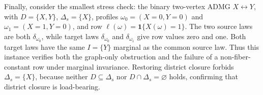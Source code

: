 Finally, consider the smallest stress check: the binary two-vertex ADMG \(X\leftrightarrow Y\), with \(D=\{X,Y\}\), \(\Delta_s=\{X\}\), profiles \(\omega_0=(X=0,Y=0)\) and \(\omega_1=(X=1,Y=0)\), and row \(\ell(\omega)=\mathbf 1\{X(\omega)=1\}\).  The two source laws are both \(\delta_{\omega_0}\), while target laws \(\delta_{\omega_0}\) and \(\delta_{\omega_1}\) give row values zero and one.  Both target laws have the same \(I=\{Y\}\) marginal as the common source law.  Thus this instance verifies both the graph-only obstruction and the failure of a non-fiber-constant row under marginal invariance.  Restoring district closure forbids \(\Delta_s=\{X\}\), because neither \(D\subseteq\Delta_s\) nor \(D\cap\Delta_s=\varnothing\) holds, confirming that district closure is load-bearing.